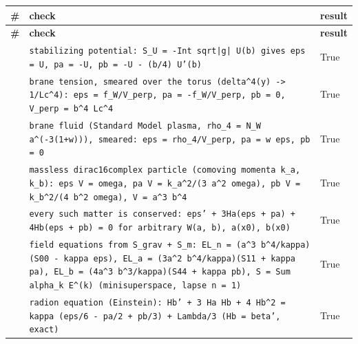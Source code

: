 \documentclass[10pt,a4paper]{article}
\begin{document}
{\footnotesize
\begin{longtable}{>{\raggedright\arraybackslash}p{}>{\raggedright\arraybackslash}p{}>{\raggedright\arraybackslash}p{}}
\toprule
\textbf{\#} & \textbf{check} & \textbf{result} \\
\midrule\endfirsthead
\toprule
\textbf{\#} & \textbf{check} & \textbf{result} \\
\midrule\endhead
\endfoot
\bottomrule\endlastfoot
1 & \texttt{stabilizing potential: S\_\allowbreak{}U = -Int sqrt|g| U(b) gives eps = U, pa = -U, pb = -U - (b/\allowbreak{}4) U'(b)} & True \\
2 & \texttt{brane tension, smeared over the torus (delta\textasciicircum{}4(y) -> 1/\allowbreak{}Lc\textasciicircum{}4): eps = f\_\allowbreak{}W/\allowbreak{}V\_\allowbreak{}perp, pa = -f\_\allowbreak{}W/\allowbreak{}V\_\allowbreak{}perp, pb = 0, V\_\allowbreak{}perp = b\textasciicircum{}4 Lc\textasciicircum{}4} & True \\
3 & \texttt{brane fluid (Standard Model plasma, rho\_\allowbreak{}4 = N\_\allowbreak{}W a\textasciicircum{}(-3(1+w))), smeared: eps = rho\_\allowbreak{}4/\allowbreak{}V\_\allowbreak{}perp, pa = w eps, pb = 0} & True \\
4 & \texttt{massless dirac16complex particle (comoving momenta k\_\allowbreak{}a, k\_\allowbreak{}b): eps V = omega, pa V = k\_\allowbreak{}a\textasciicircum{}2/\allowbreak{}(3 a\textasciicircum{}2 omega), pb V = k\_\allowbreak{}b\textasciicircum{}2/\allowbreak{}(4 b\textasciicircum{}2 omega), V = a\textasciicircum{}3 b\textasciicircum{}4} & True \\
5 & \texttt{every such matter is conserved: eps' + 3Ha(eps + pa) + 4Hb(eps + pb) = 0 for arbitrary W(a, b), a(x0), b(x0)} & True \\
6 & \texttt{field equations from S\_\allowbreak{}grav + S\_\allowbreak{}m: EL\_\allowbreak{}n = (a\textasciicircum{}3 b\textasciicircum{}4/\allowbreak{}kappa)(S00 - kappa eps), EL\_\allowbreak{}a = (3a\textasciicircum{}2 b\textasciicircum{}4/\allowbreak{}kappa)(S11 + kappa pa), EL\_\allowbreak{}b = (4a\textasciicircum{}3 b\textasciicircum{}3/\allowbreak{}kappa)(S44 + kappa pb), S = Sum alpha\_\allowbreak{}k E\textasciicircum{}(k) (minisuperspace, lapse n = 1)} & True \\
7 & \texttt{radion equation (Einstein): Hb' + 3 Ha Hb + 4 Hb\textasciicircum{}2 = kappa (eps/\allowbreak{}6 - pa/\allowbreak{}2 + pb/\allowbreak{}3) + Lambda/\allowbreak{}3 (Hb = beta', exact)} & True \\

\end{longtable}}
\end{document}
